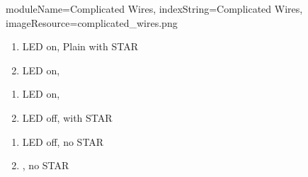 \begin{module}{
  moduleName=Complicated Wires,
  indexString=Complicated Wires,
  imageResource=complicated_wires.png
}
\begin{minipage}[t]{0.48\textwidth}
\vspace{0.5cm}

\begin{enumerate}
  \renewcommand{\labelenumi}{\alph{enumi}.}
  \item LED on, Plain \WHITE with STAR
  \item LED on, \RED
\end{enumerate}
\end{minipage}
\hfill
\begin{minipage}[t]{0.48\textwidth}
\begin{enumerate}
  \renewcommand{\labelenumi}{\alph{enumi}.}
  \item LED on, \BLUE
  \item LED off, \PURPLE with STAR
\end{enumerate}

\vspace{0.5cm}

\begin{enumerate}
  \renewcommand{\labelenumi}{\alph{enumi}.}
  \setcounter{enumi}{2}
  \item LED off, no STAR
  \item \PURPLE, no STAR
\end{enumerate}
\end{minipage}

\vspace{1.5cm}

\begin{center}
\large{}
\end{center}


\end{module}
